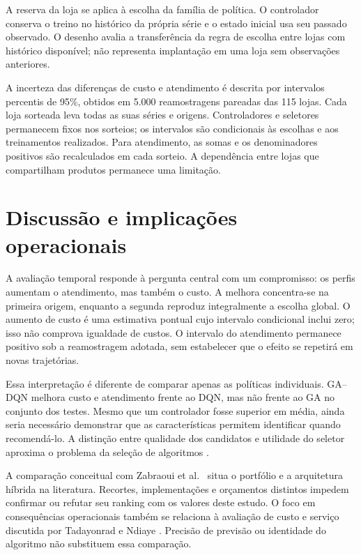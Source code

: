 \documentclass[preprint,12pt]{elsarticle}
\begin{document}
A reserva da loja se aplica à escolha da família de política. O controlador conserva o treino no histórico da própria série e o estado inicial usa seu passado observado. O desenho avalia a transferência da regra de escolha entre lojas com histórico disponível; não representa implantação em uma loja sem observações anteriores.

A incerteza das diferenças de custo e atendimento é descrita por intervalos percentis de 95\%, obtidos em 5.000 reamostragens pareadas das 115 lojas. Cada loja sorteada leva todas as suas séries e origens. Controladores e seletores permanecem fixos nos sorteios; os intervalos são condicionais às escolhas e aos treinamentos realizados. Para atendimento, as somas e os denominadores positivos são recalculados em cada sorteio. A dependência entre lojas que compartilham produtos permanece uma limitação.



\section{Discussão e implicações operacionais}
A avaliação temporal responde à pergunta central com um compromisso: os perfis aumentam o atendimento, mas também o custo. A melhora concentra-se na primeira origem, enquanto a segunda reproduz integralmente a escolha global. O aumento de custo é uma estimativa pontual cujo intervalo condicional inclui zero; isso não comprova igualdade de custos. O intervalo do atendimento permanece positivo sob a reamostragem adotada, sem estabelecer que o efeito se repetirá em novas trajetórias.

Essa interpretação é diferente de comparar apenas as políticas individuais. GA--DQN melhora custo e atendimento frente ao DQN, mas não frente ao GA no conjunto dos testes. Mesmo que um controlador fosse superior em média, ainda seria necessário demonstrar que as características permitem identificar quando recomendá-lo. A distinção entre qualidade dos candidatos e utilidade do seletor aproxima o problema da seleção de algoritmos \cite{rice1976,Kotthoff2014AlgorithmSelection}.

A comparação conceitual com Zabraoui et al.\ \cite{sca_27e994c54848} situa o portfólio e a arquitetura híbrida na literatura. Recortes, implementações e orçamentos distintos impedem confirmar ou refutar seu ranking com os valores deste estudo. O foco em consequências operacionais também se relaciona à avaliação de custo e serviço discutida por Tadayonrad e Ndiaye \cite{sca_f81ad2b3e023}. Precisão de previsão ou identidade do algoritmo não substituem essa comparação.
\end{document}
